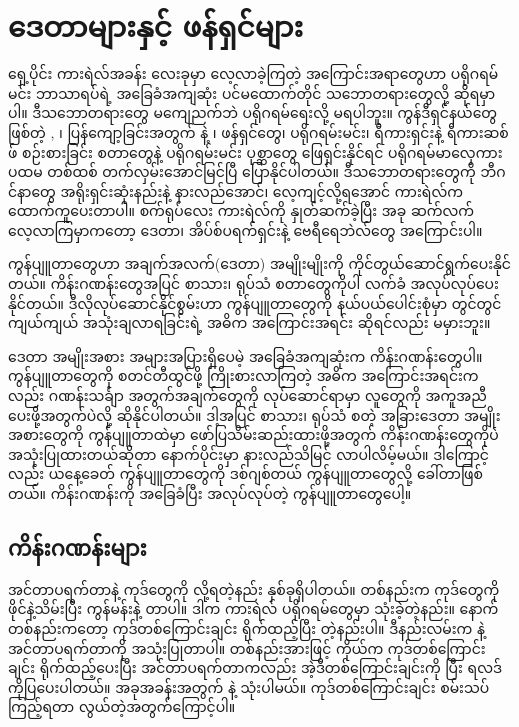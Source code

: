 \chapter{ဒေတာများနှင့် ဖန်ရှင်များ} \label{ch:ch05}

ရှေ့ပိုင်း ကားရဲလ်အခန်း လေးခုမှာ လေ့လာခဲ့ကြတဲ့ အကြောင်းအရာတွေဟာ ပရိုဂရမ်မင်း ဘာသာရပ်ရဲ့ အခြေခံအကျဆုံး ပင်မထောက်တိုင် သဘောတရားတွေလို့ ဆိုရမှာပါ။ ဒီသဘောတရားတွေ မကျေညက်ဘဲ ပရိုဂရမ်ရေးလို့ မရပါဘူး။ ကွန်ဒီရှင်နယ်တွေဖြစ်တဲ့ , ၊ ပြန်ကျော့ခြင်းအတွက်  နဲ့  ၊ ဖန်ရှင်တွေ၊  ပရိုဂရမ်းမင်း၊ ရီကားရှင်းနဲ့ ရီကားဆစ်ဖ် စဉ်းစားခြင်း စတာတွေနဲ့ ပရိုဂရမ်းမင်း ပုစ္ဆာတွေ ဖြေရှင်းနိုင်ရင် ပရိုဂရမ်မာလှေကား ပထမ တစ်ထစ် တက်လှမ်းအောင်မြင်ပြီ ပြောနိုင်ပါတယ်။ ဒီသဘောတရားတွေကို ဘီဂင်နာတွေ အရိုးရှင်းဆုံးနည်းနဲ့ နားလည်အောင်၊ လေ့ကျင့်လို့ရအောင် ကားရဲလ်က ထောက်ကူပေးတာပါ။ စက်ရုပ်လေး ကားရဲလ်ကို နှုတ်ဆက်ခဲ့ပြီး အခု ဆက်လက်လေ့လာကြမှာကတော့ ဒေတာ၊ အိပ်စ်ပရက်ရှင်းနဲ့ ဗေရီရေဘဲလ်တွေ အကြောင်းပါ။ 

ကွန်ပျူတာတွေဟာ အချက်အလက်(ဒေတာ) အမျိုးမျိုးကို ကိုင်တွယ်ဆောင်ရွက်ပေးနိုင်တယ်။ ကိန်း\allowbreak ဂဏန်းတွေအပြင် စာသား၊ ရုပ်သံ စတာတွေကိုပါ လက်ခံ အလုပ်လုပ်ပေးနိုင်တယ်။ ဒီလိုလုပ်ဆောင်နိုင်စွမ်းဟာ ကွန်ပျူတာတွေကို နယ်ပယ်ပေါင်းစုံမှာ တွင်တွင်ကျယ်ကျယ် အသုံးချလာရခြင်းရဲ့ အဓိက အကြောင်းအရင်း ဆိုရင်လည်း မမှားဘူး။

ဒေတာ အမျိုးအစား အများအပြားရှိပေမဲ့ အခြေခံအကျဆုံးက ကိန်းဂဏန်းတွေပါ။ ကွန်ပျူတာတွေကို စတင်တီထွင်ဖို့ ကြိုးစားလာကြတဲ့ အဓိက အကြောင်းအရင်းကလည်း ဂဏန်းသင်္ချာ အတွက်အချက်တွေကို လုပ်ဆောင်ရာမှာ လူတွေကို အကူအညီ ပေးဖို့အတွက်ပဲလို့ ဆိုနိုင်ပါတယ်။ ဒါ့အပြင် စာသား၊ ရုပ်သံ စတဲ့ အခြားဒေတာ အမျိုးအစားတွေကို ကွန်ပျူတာထဲမှာ ဖော်ပြသိမ်းဆည်းထားဖို့အတွက် ကိန်းဂဏန်းတွေကိုပဲ အသုံးပြုထားတယ်ဆိုတာ နောက်ပိုင်းမှာ နားလည်သိမြင် လာပါလိမ့်မယ်။ ဒါကြောင့်လည်း ယနေ့ခေတ် ကွန်ပျူတာတွေကို ဒစ်ဂျစ်တယ် ကွန်ပျူတာတွေလို့ ခေါ်တာဖြစ်တယ်။ ကိန်းဂဏန်းကို အခြေခံပြီး အလုပ်လုပ်တဲ့ ကွန်ပျူတာတွေပေါ့။ 

\section{ကိန်းဂဏန်းများ}


 အင်တာပရက်တာနဲ့  ကုဒ်တွေကို  လို့ရတဲ့နည်း နှစ်ခုရှိပါတယ်။ တစ်နည်းက ကုဒ်တွေကို  ဖိုင်နဲ့သိမ်းပြီး  ကွန်မန်းနဲ့  တာပါ။ ဒါက ကားရဲလ် ပရိုဂရမ်တွေမှာ သုံးခဲ့တဲ့နည်း။ နောက်တစ်နည်းကတော့ ကုဒ်တစ်ကြောင်းချင်း ရိုက်ထည့်ပြီး  တဲ့နည်းပါ။ ဒီနည်းလမ်းက  နဲ့ အင်တာပရက်တာကို အသုံးပြုတာပါ။ တစ်နည်းအားဖြင့် ကိုယ်က ကုဒ်တစ်ကြောင်းချင်း ရိုက်ထည့်ပေးပြီး အင်တာပရက်တာကလည်း အဲ့ဒီတစ်ကြောင်းချင်းကို  ပြီး ရလဒ်ကိုပြပေးပါတယ်။ အခုအခန်းအတွက်  နဲ့ သုံးပါမယ်။ ကုဒ်တစ်ကြောင်းချင်း စမ်းသပ်ကြည့်ရတာ လွယ်တဲ့အတွက်ကြောင့်ပါ။ 

